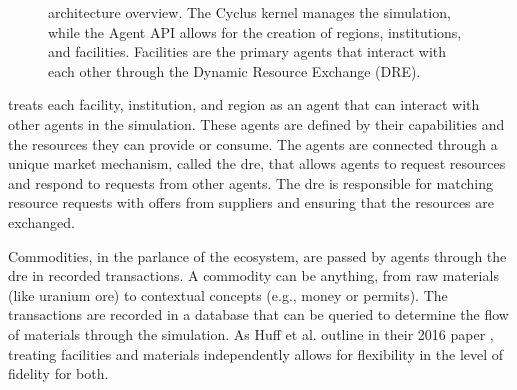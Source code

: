 \begin{figure}[H]
    \centering
    \caption{\cyclus architecture overview. The Cyclus kernel manages the simulation, while the Agent API allows for the creation of regions, institutions, and facilities. Facilities are the primary agents that interact with each other through the Dynamic Resource Exchange (DRE).}
    \label{fig:cyclus_architecture}
\end{figure}

\cyclus treats each facility, institution, and region as an agent that can
interact with other agents in the simulation. These agents are defined by their
capabilities and the resources they can provide or consume. The agents are
connected through a unique market mechanism, called the \gls{dre}, that allows
agents to request resources and respond to requests from other agents. The
\gls{dre} is responsible for matching resource requests with offers from
suppliers and ensuring that the resources are exchanged.

Commodities, in the parlance of the \cyclus ecosystem, are passed by agents through the \gls{dre} in recorded transactions. A commodity can be anything, from raw materials (like uranium ore) to contextual concepts (e.g., money or permits). The transactions are recorded in a database that can be queried to determine the flow of materials through the simulation. As Huff et al. outline in their 2016 paper \cite{huff_cyclus_intro_2016}, treating facilities and materials independently allows for flexibility in the level of fidelity for both.

